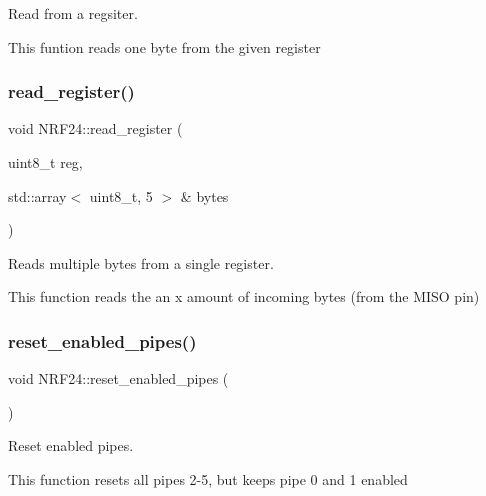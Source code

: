 Read from a regsiter. 

This funtion reads one byte from the given register \mbox{\label{classNRF24_a3e34e1a79e35a382137b176cbe4359b8}} 
\subsubsection{\texorpdfstring{read\+\_\+register()}{read\_register()}\hspace{0.1cm}{\footnotesize\ttfamily [2/2]}}
{\footnotesize\ttfamily void N\+R\+F24\+::read\+\_\+register (\begin{DoxyParamCaption}\item[{uint8\+\_\+t}]{reg,  }\item[{std\+::array$<$ uint8\+\_\+t, 5 $>$ \&}]{bytes }\end{DoxyParamCaption})\hspace{0.3cm}{\ttfamily [protected]}}



Reads multiple bytes from a single register. 

This function reads the an x amount of incoming bytes (from the M\+I\+SO pin) \mbox{\label{classNRF24_a18094a007c01ae62bd86a6e314bf0416}} 
\subsubsection{\texorpdfstring{reset\+\_\+enabled\+\_\+pipes()}{reset\_enabled\_pipes()}}
{\footnotesize\ttfamily void N\+R\+F24\+::reset\+\_\+enabled\+\_\+pipes (\begin{DoxyParamCaption}{ }\end{DoxyParamCaption})\hspace{0.3cm}{\ttfamily [protected]}}



Reset enabled pipes. 

This function resets all pipes 2-\/5, but keeps pipe 0 and 1 enabled \mbox{\label{classNRF24_a073930d0c3f900010309670712acc677}} 
